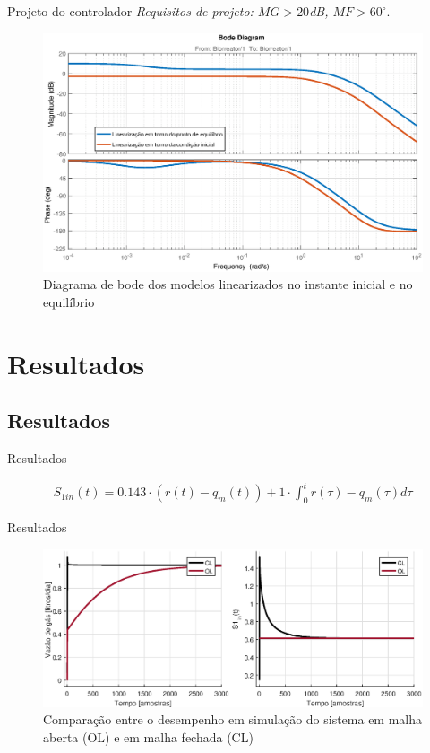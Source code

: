 \documentclass[10pt]{beamer}
\begin{document}
\begin{frame}[fragile]{Projeto do controlador}
\textit{Requisitos de projeto: $MG>20$dB, $MF>60^{\circ}$}.

\begin{center}
\begin{figure}
\includegraphics[width=1\textwidth]{figures/bode.eps}
\caption{Diagrama de bode dos modelos linearizados no instante inicial e no equilíbrio}
\end{figure}
\end{center}

\end{frame}

\section{Resultados}
\subsection{Resultados}
\begin{frame}[fragile]{Resultados}
\begin{tcolorbox}[title= Controlador]
\begin{gather}
S_{1in}(t) =  0.143 \cdot (r(t)-q_m(t)) + 1 \cdot \int_{0}^{t} r(\tau)-q_m(\tau) d\tau  \label{PI} \nonumber
\end{gather} 
\end{tcolorbox}
\end{frame}

\begin{frame}[fragile]{Resultados}
\begin{figure}
\includegraphics[width=1\textwidth]{figures/comparacao.eps}
\caption{Comparação entre o desempenho em simulação do sistema em malha aberta (OL) e em malha fechada (CL)}
\end{figure}
\end{frame}
\end{document}
